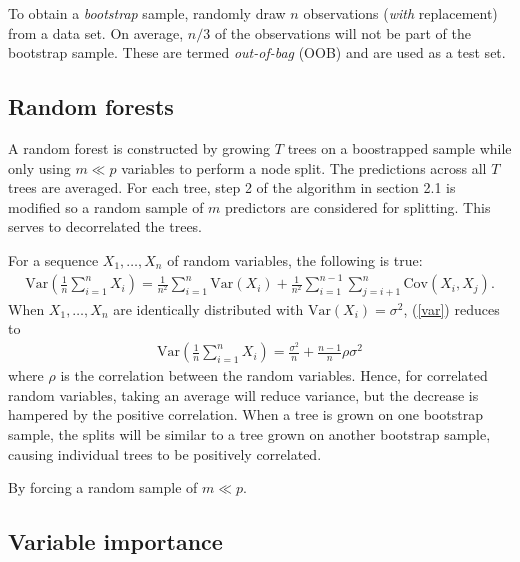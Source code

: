 To obtain a \emph{bootstrap} sample, randomly draw $n$ observations (\emph{with} replacement) from a data set. On average, $n/3$ of the observations will not be part of the bootstrap sample. These are termed \emph{out-of-bag} (OOB) and are used as a test set.

\subsection{Random forests}

A random forest is constructed by growing $T$ trees on a boostrapped sample while only using $m\ll p$ variables to perform a node split. The predictions across all $T$ trees are averaged. For each tree, step 2 of the algorithm in section 2.1 is modified so a random sample of $m$ predictors are considered for splitting. This serves to decorrelated the trees.

For a sequence $X_1,\ldots,X_n$ of random variables, the following is true:
\begin{eqnarray}
\mathrm{Var}\left(\frac{1}{n}\sum_{i=1}^nX_i\right) = \frac{1}{n^2}\sum_{i=1}^n\mathrm{Var}(X_i) + \frac{1}{n^2}\sum_{i=1}^{n-1}\sum_{j=i+1}^n\mathrm{Cov}(X_i,X_j).
\label{var}
\end{eqnarray}
When $X_1,\ldots,X_n$ are identically distributed with $\mathrm{Var}(X_i)=\sigma^2$, (\ref{var}) reduces to
\begin{eqnarray}
\mathrm{Var}\left(\frac{1}{n}\sum_{i=1}^nX_i\right) = \frac{\sigma^2}{n} + \frac{n-1}{n}\rho\sigma^2
\end{eqnarray}
where $\rho$ is the correlation between the random variables. Hence, for correlated random variables, taking an average will reduce variance, but the decrease is hampered by the positive correlation. When a tree is grown on one bootstrap sample, the splits will be similar to a tree grown on another bootstrap sample, causing individual trees to be positively correlated.

By forcing a random sample of $m\ll p$.


\subsection{Variable importance}
